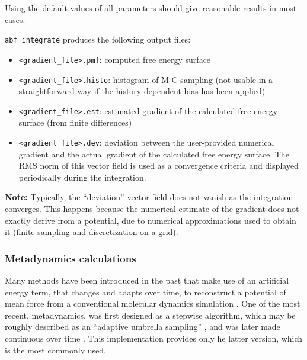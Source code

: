 Using the default values of all parameters should give reasonable results in most cases.

\bigskip
\texttt{abf\_integrate} produces the following output files:
\begin{itemize}
\setlength{\itemsep}{0pt}
\item \texttt{<gradient\_file>.pmf}: computed free energy surface
\item \texttt{<gradient\_file>.histo}: histogram of M-C sampling (not
usable in a straightforward way if the history-dependent bias has been applied)
\item \texttt{<gradient\_file>.est}: estimated gradient of the calculated free energy surface
(from finite differences)
\item \texttt{<gradient\_file>.dev}: deviation between the user-provided numerical gradient
and the actual gradient of the calculated free energy surface. The RMS norm of this vector
field is used as a convergence criteria and displayed periodically during the integration.
\end{itemize}

\textbf{Note:} Typically, the ``deviation'' vector field does not
vanish as the integration converges. This happens because the
numerical estimate of the gradient does not exactly derive from a
potential, due to numerical approximations used to obtain it (finite
sampling and discretization on a grid).



\subsubsection{Metadynamics calculations}
\label{sec:colvarbias_meta}

Many methods have been introduced in the past that make use of an
artificial energy term, that changes and adapts over time, to
reconstruct a potential of mean force from a conventional molecular
dynamics simulation \cite{Huber1994, Grubmuller1995, Voter1997,
  Darve2001, Laio2002, Hummer2003}.  One of the most recent,
metadynamics, was first designed as a stepwise algorithm, which may
be roughly described as an ``adaptive umbrella sampling''
\cite{Laio2002}, and was later made continuous over time
\cite{Iannuzzi2003}.  This implementation provides only he latter
version, which is the most commonly used.

